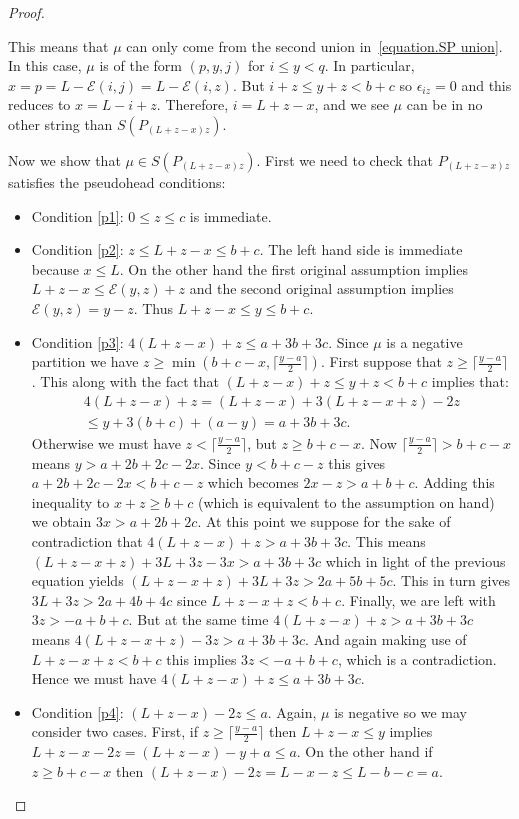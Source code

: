 \documentclass[11pt,reqno]{amsart}
\theoremstyle{definition}
\numberwithin{equation}{section}
\begin{document}
\begin{proof}
\begin{enumerate}
{This means that $\mu$ can only come from the second union in~\eqref{equation.SP union}.
In this case, $\mu$ is of the form $(p,y,j)$ for $i \leqslant y<q$.  
In particular, $x=p=L-\mathcal{E}(i,j)=L-\mathcal{E}(i,z)$.  But $i+z \leqslant y+z <b+c$ so $\epsilon_{iz}=0$ and this reduces to 
$x=L-i+z$.  Therefore, $i=L+z-x$, and we see $\mu$ can be in no other string than $S(P_{(L+z-x)z})$.

Now we show that $\mu \in S(P_{(L+z-x)z})$.  First we need to check that $P_{(L+z-x)z}$ satisfies the pseudohead conditions:
\begin{itemize}
\item Condition \eqref{p1}: $0 \leqslant z \leqslant c$ is immediate.
\item Condition \eqref{p2}: $z\leqslant L+z-x \leqslant b+c$.  The left hand side is immediate because $x \leqslant L$.
On the other hand the first original assumption implies $L+z-x \leqslant \mathcal{E}(y,z)+z$ and the second original 
assumption implies $\mathcal{E}(y,z)=y-z$.  Thus $L+z-x \leqslant y \leqslant b+c$.
\item Condition \eqref{p3}: $4(L+z-x)+z \leqslant a+3b+3c$.  Since $\mu$ is a negative partition we have 
$z \geqslant \min(b+c-x,\lceil \frac{y-a}{2}\rceil)$.  First suppose that $z \geqslant \lceil \frac{y-a}{2}\rceil$.  
This along with the fact that $(L+z-x)+z \leqslant y+z <b+c$ implies that: 
\begin{eqnarray*}
4(L+z-x)+z=(L+z-x)+3(L+z-x+z)-2z \\ 
\leqslant y+3(b+c)+(a-y) = a+3b+3c.
\end{eqnarray*}
Otherwise we must have $z< \lceil \frac{y-a}{2}\rceil$, but $z \geqslant b+c-x$. Now $\lceil \frac{y-a}{2}\rceil>b+c-x$ 
means $y>a+2b+2c-2x$.  Since $y<b+c-z$ this gives $a+2b+2c-2x<b+c-z$ which becomes $2x-z>a+b+c$.  
Adding this inequality to $x+z \geqslant b+c$ (which is equivalent to the assumption on hand) we obtain $3x>a+2b+2c$. 
At this point we suppose for the sake of contradiction that $4(L+z-x)+z > a+3b+3c$.  This means 
$(L+z-x+z)+3L+3z-3x>a+3b+3c$ which in light of the previous equation yields $(L+z-x+z)+3L+3z > 2a+5b+5c$. 
This in turn gives $3L+3z>2a+4b+4c$ since $L+z-x+z<b+c$.  Finally, we are left with $3z>-a+b+c$.  But at the 
same time $4(L+z-x)+z > a+3b+3c$ means $4(L+z-x+z)-3z > a+3b+3c$.  And again making use of $L+z-x+z<b+c$ 
this implies $3z<-a+b+c$, which is a contradiction. Hence we must have $4(L+z-x)+z \leqslant a+3b+3c$.
\item Condition \eqref{p4}: $(L+z-x)-2z \leqslant a$.  Again, $\mu$ is negative so we may consider two cases.  
First, if $z \geqslant \lceil \frac{y-a}{2}\rceil$ then $L+z-x \leqslant y$ implies $L+z-x-2z=(L+z-x)-y+a\leqslant a$.  
On the other hand if $z \geqslant b+c-x$ then $(L+z-x)-2z=L-x-z \leqslant L-b-c=a$.
\end{itemize}

}
\end{enumerate}
\end{proof}
\end{document}
